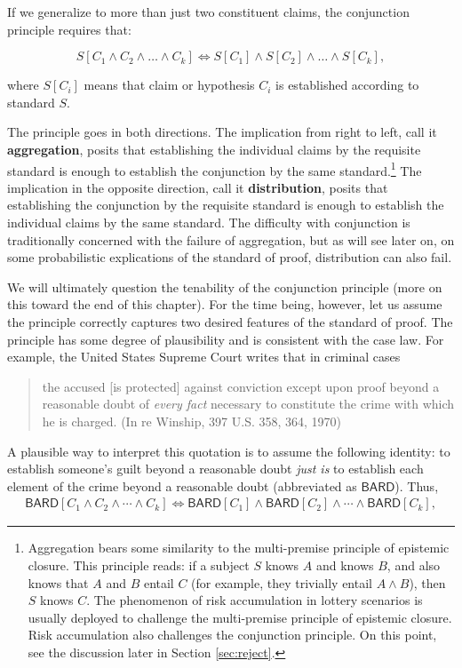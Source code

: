 \documentclass[
  10pt,
  dvipsnames,enabledeprecatedfontcommands]{scrartcl}
\begin{document}
\noindent If we generalize to more than just two constituent claims, the
conjunction principle requires that:

\[S[C_1 \wedge C_2  \wedge \dots \wedge  C_k] \Leftrightarrow S[C_1] \wedge S[C_2]  \wedge \dots \wedge  S[C_k],\]

\noindent where \(S[C_i]\) means that claim or hypothesis \(C_i\) is
established according to standard \(S\).

The principle goes in both directions. The implication from right to
left, call it \textbf{aggregation}, posits that establishing the
individual claims by the requisite standard is enough to establish the
conjunction by the same standard.\footnote{Aggregation bears some
  similarity to the multi-premise principle of epistemic closure. This
  principle reads: if a subject \(S\) knows \(A\) and knows \(B\), and
  also knows that \(A\) and \(B\) entail \(C\) (for example, they
  trivially entail \(A\wedge B\)), then \(S\) knows \(C\). The
  phenomenon of risk accumulation in lottery scenarios is usually
  deployed to challenge the multi-premise principle of epistemic
  closure. Risk accumulation also challenges the conjunction principle.
  On this point, see the discussion later in Section \ref{sec:reject}.}
The implication in the opposite direction, call it
\textbf{distribution}, posits that establishing the conjunction by the
requisite standard is enough to establish the individual claims by the
same standard. The difficulty with conjunction is traditionally
concerned with the failure of aggregation, but as will see later on, on
some probabilistic explications of the standard of proof, distribution
can also fail.

We will ultimately question the tenability of the conjunction principle
(more on this toward the end of this chapter). For the time being,
however, let us assume the principle correctly captures two desired
features of the standard of proof. The principle has some degree of
plausibility and is consistent with the case law. For example, the
United States Supreme Court writes that in criminal cases

\begin{quote}
the accused [is protected] against conviction except upon proof beyond a reasonable doubt of \textit{every fact} necessary to constitute the crime with which he is charged. \linebreak 
(In re Winship, 397 U.S. 358, 364, 1970)
\end{quote}

\noindent A plausible way to interpret this quotation is to assume the
following identity: to establish someone's guilt beyond a reasonable
doubt \textit{just is} to establish each element of the crime beyond a
reasonable doubt (abbreviated as \(\mathsf{BARD}\)). Thus,
\begin{align*}\mathsf{BARD}[C_1 \wedge C_2   \wedge \cdots \wedge C_k] \Leftrightarrow \mathsf{BARD}[C_1] \wedge \mathsf{BARD}[C_2]  \wedge \cdots \wedge \mathsf{BARD}[C_k],
\end{align*}
\end{document}
